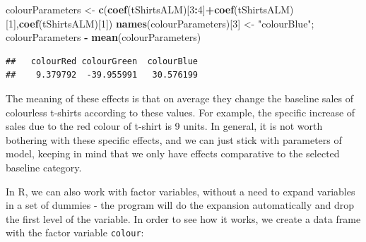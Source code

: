 \documentclass[
]{book}
\newenvironment{Shaded}{\begin{snugshade}}{\end{snugshade}}
\newcommand{\DecValTok}[1]{\textcolor[rgb]{0.00,0.00,0.81}{#1}}
\newcommand{\KeywordTok}[1]{\textcolor[rgb]{0.13,0.29,0.53}{\textbf{#1}}}
\newcommand{\NormalTok}[1]{#1}
\newcommand{\OperatorTok}[1]{\textcolor[rgb]{0.81,0.36,0.00}{\textbf{#1}}}
\newcommand{\StringTok}[1]{\textcolor[rgb]{0.31,0.60,0.02}{#1}}
\theoremstyle{definition}
\theoremstyle{definition}
\theoremstyle{definition}
\theoremstyle{definition}
\theoremstyle{remark}
\begin{document}
\begin{Shaded}
\begin{Highlighting}[]
\NormalTok{colourParameters \textless{}{-}}\StringTok{ }\KeywordTok{c}\NormalTok{(}\KeywordTok{coef}\NormalTok{(tShirtsALM)[}\DecValTok{3}\OperatorTok{:}\DecValTok{4}\NormalTok{]}\OperatorTok{+}\KeywordTok{coef}\NormalTok{(tShirtsALM)[}\DecValTok{1}\NormalTok{],}\KeywordTok{coef}\NormalTok{(tShirtsALM)[}\DecValTok{1}\NormalTok{])}
\KeywordTok{names}\NormalTok{(colourParameters)[}\DecValTok{3}\NormalTok{] \textless{}{-}}\StringTok{ "colourBlue"}\NormalTok{;}
\NormalTok{colourParameters }\OperatorTok{{-}}\StringTok{ }\KeywordTok{mean}\NormalTok{(colourParameters)}
\end{Highlighting}
\end{Shaded}

\begin{verbatim}
##   colourRed colourGreen  colourBlue 
##    9.379792  -39.955991   30.576199
\end{verbatim}

The meaning of these effects is that on average they change the baseline sales of colourless t-shirts according to these values. For example, the specific increase of sales due to the red colour of t-shirt is 9 units. In general, it is not worth bothering with these specific effects, and we can just stick with parameters of model, keeping in mind that we only have effects comparative to the selected baseline category.

In R, we can also work with factor variables, without a need to expand variables in a set of dummies - the program will do the expansion automatically and drop the first level of the variable. In order to see how it works, we create a data frame with the factor variable \texttt{colour}:

\begin{Shaded}
\end{Shaded}
\end{document}

